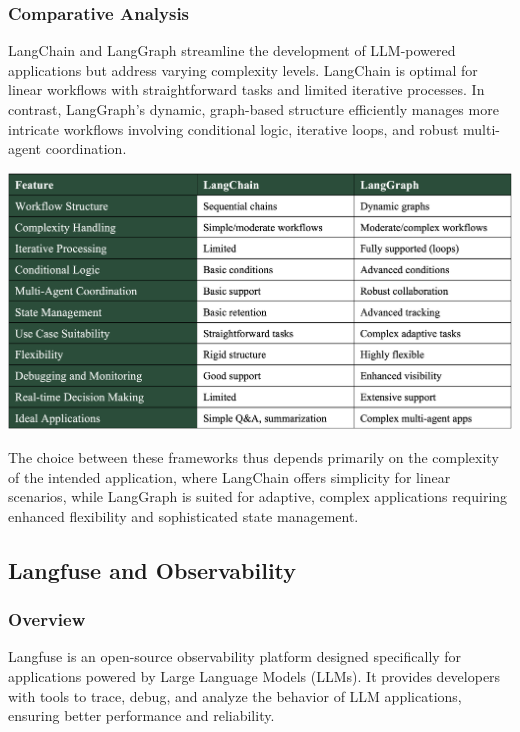 \subsubsection{Comparative Analysis}
LangChain and LangGraph streamline the development of LLM-powered applications but address varying complexity levels. LangChain is optimal for linear workflows with straightforward tasks and limited iterative processes. In contrast, LangGraph’s dynamic, graph-based structure efficiently manages more intricate workflows involving conditional logic, iterative loops, and robust multi-agent coordination.

\begin{center}
    \centering
    \includegraphics[width=1\textwidth]{Images/Comparison of LangChain and LangGraph.png}
    \label{tab:langchain_langgraph_comparison}
\end{center}

The choice between these frameworks thus depends primarily on the complexity of the intended application, where LangChain offers simplicity for linear scenarios, while LangGraph is suited for adaptive, complex applications requiring enhanced flexibility and sophisticated state management.

\subsection{Langfuse and Observability}

\subsubsection{Overview}
Langfuse is an open-source observability platform designed specifically for applications powered by Large Language Models (LLMs). It provides developers with tools to trace, debug, and analyze the behavior of LLM applications, ensuring better performance and reliability.

